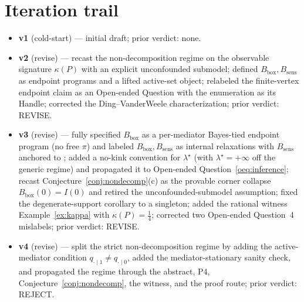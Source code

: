 \documentclass[11pt]{article}
\theoremstyle{definition}
\theoremstyle{plain}
\theoremstyle{remark}
\begin{document}
\section{Iteration trail}
\label{sec:trail}
\begin{itemize}[leftmargin=1.5em,itemsep=1pt]
  \item \textbf{v1} (cold-start) --- initial draft; prior verdict: none.
  \item \textbf{v2} (revise) --- recast the non-decomposition regime on the observable signature
        $\kappa(P)$ with an explicit unconfounded submodel; defined $B_{\mathrm{box}},B_{\mathrm{sens}}$ as
        endpoint programs and a lifted active-set object; relabeled the finite-vertex endpoint claim as an
        Open-ended Question with the enumeration as its Handle; corrected the Ding--VanderWeele
        characterization; prior verdict: REVISE.
  \item \textbf{v3} (revise) --- fully specified $B_{\mathrm{box}}$ as a per-mediator Bayes-tied endpoint
        program (no free $\pi$) and labeled $B_{\mathrm{box}},B_{\mathrm{sens}}$ as internal relaxations with
        $B_{\mathrm{sens}}$ anchored to \citet{FrauenMelnychukFeuerriegel2023SharpBounds}; added a no-kink
        convention for $\lambda^\star$ (with $\lambda^\star=+\infty$ off the generic regime) and propagated it
        to Open-ended Question~\ref{oeq:inference}; recast Conjecture~\ref{conj:nondecomp}(c) as the
        provable corner collapse $B_{\mathrm{box}}(0)=I(0)$ and retired the unconfounded-submodel assumption;
        fixed the degenerate-support corollary to a singleton; added the rational witness
        Example~\ref{ex:kappa} with $\kappa(P)=\tfrac14$; corrected two Open-ended Question~4 mislabels;
        prior verdict: REVISE.
  \item \textbf{v4} (revise) --- split the strict non-decomposition regime by adding the active-mediator
        condition $q_{\cdot\mid1}\neq q_{\cdot\mid0}$, added the mediator-stationary sanity check, and
        propagated the regime through the abstract, P4, Conjecture~\ref{conj:nondecomp}, the witness, and
        the proof route; prior verdict: REJECT.
\end{itemize}
\end{document}

